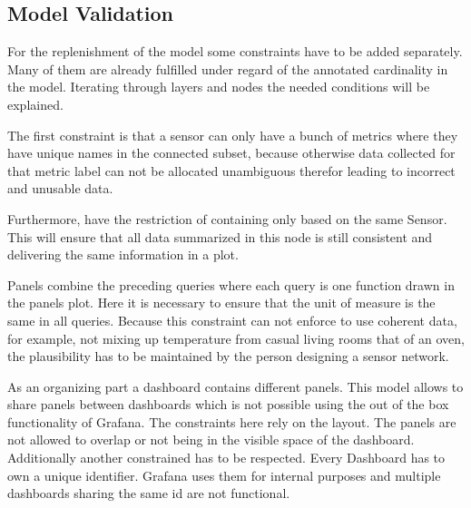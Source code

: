 \subsection{Model Validation}
For the replenishment of the model some constraints have to be added separately. Many of them are already fulfilled under regard of the annotated cardinality in the model. Iterating through layers and nodes the needed conditions will be explained. 

The first constraint is that a sensor can only have a bunch of metrics where they have unique names in the connected subset, because otherwise data collected for that metric label can not be allocated unambiguous therefor leading to incorrect and unusable data. 

Furthermore,  have the restriction of containing only  based on the same Sensor. This will ensure that all data summarized in this node is still consistent and delivering the same information in a plot.

Panels combine the preceding queries where each query is one function drawn in the panels plot. Here it is necessary to ensure that the unit of measure is the same in all queries. Because this constraint can not enforce to use coherent data, for example, not mixing up temperature from casual living rooms that of an oven, the plausibility has to be maintained by the person designing a sensor network.

As an organizing part a dashboard contains different panels. This model allows to share panels between dashboards which is not possible using the out of the box functionality of Grafana. The constraints here rely on the layout. The panels are not allowed to overlap or not being in the visible space of the dashboard. Additionally another constrained has to be respected. Every Dashboard has to own a unique identifier. Grafana uses them for internal purposes and multiple dashboards sharing the same id are not functional.



